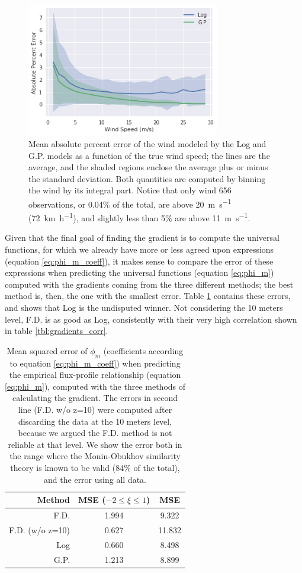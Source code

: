 \documentclass[12pt]{book}
\begin{document}
\begin{figure}
    \centering
	\includegraphics[width=0.75\textwidth]{images/gp_log_perc_err_wind_speed}
	\caption{Mean absolute percent error of the wind modeled by the Log and G.P. models as a function of the true wind speed; the lines are the average, and the shaded regions enclose the average plus or minus the standard deviation. Both quantities are computed by binning the wind by its integral part. Notice that only wind 656 observations, or 0.04\% of the total, are above \SI{20}{\meter\per\second} (\SI{72}{\kilo\meter\per\hour}), and slightly less than 5\% are above \SI{11}{\meter\per\second}.}
	\label{fig:gp_log_perc_err_wind_speed}
\end{figure}


Given that the final goal of finding the gradient is to compute the universal functions, for which we already have more or less agreed upon expressions (equation \ref{eq:phi_m_coeff}), it makes sense to compare the error of these expressions when predicting the universal functions (equation \ref{eq:phi_m}) computed with the gradients coming from the three different methods; the best method is, then, the one with the smallest error. Table \ref{tbl:gradient_errors} contains these errors, and shows that Log is the undisputed winner. Not considering the 10 meters level, F.D. is as good as Log, consistently with their very high correlation shown in table \ref{tbl:gradients_corr}.


\begin{table}[]
\centering
\caption{Mean squared error of $\phi_m$ (coefficients according to equation \ref{eq:phi_m_coeff}) when predicting the empirical flux-profile relationship (equation \ref{eq:phi_m}), computed with the three methods of calculating the gradient. The errors in second line (F.D. w/o z=10) were computed after discarding the data at the 10 meters level, because we argued the F.D. method is not reliable at that level. We show the error both in the range where the Monin-Obukhov similarity theory is known to be valid (84\% of the total), and the error using all data.}
\label{tbl:gradient_errors}
\begin{tabular}{r|c|c}
Method & MSE ($-2\leq\xi\leq1$) & MSE \\ \hline
F.D. & 1.994 & 9.322 \\
F.D. (w/o z=10) & 0.627  & 11.832 \\
Log & 0.660 & 8.498 \\
G.P. & 1.213 & 8.899
\end{tabular}
\end{table}
\end{document}
